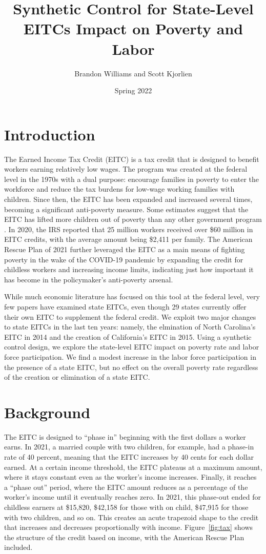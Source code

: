 \documentclass{article}
\author{Brandon Williams and Scott Kjorlien}
\title{Synthetic Control for State-Level EITCs Impact on Poverty and Labor}
\date{Spring 2022}
\begin{document}
\maketitle

\section{Introduction}

The Earned Income Tax Credit (EITC) is a tax credit that is designed to benefit workers earning relatively low wages. The program was created at the federal level in the 1970s with a dual purpose: encourage families in poverty to enter the workforce and reduce the tax burdens for low-wage working families with children. Since then, the EITC has been expanded and increased several times, becoming a significant anti-poverty measure. Some estimates suggest that the EITC has lifted more children out of poverty than any other government program  \citep{zahradnik2004state}. In 2020, the IRS reported that 25 million workers received over \$60 million in EITC credits, with the average amount being \$2,411 per family. The American Rescue Plan of 2021 further leveraged the EITC as a main means of fighting poverty in the wake of the COVID-19 pandemic by expanding the credit for childless workers and increasing income limits, indicating just how important it has become in the policymaker’s anti-poverty arsenal.

While much economic literature has focused on this tool at the federal level, very few papers have examined state EITCs, even though 29 states currently offer their own EITC to supplement the federal credit. We exploit two major changes to state EITCs in the last ten years: namely, the elmination of North Carolina's EITC in 2014 and the creation of California's EITC in 2015. Using a synthetic control design, we explore the state-level EITC impact on poverty rate and labor force participation. We find a modest increase in the labor force participation in the presence of a state EITC, but no effect on the overall poverty rate regardless of the creation or elimination of a state EITC. 

\section{Background}

The EITC is designed to “phase in” beginning with the first dollars a worker earns. In 2021, a married couple with two children, for example, had a phase-in rate of 40 percent, meaning that the EITC increases by 40 cents for each dollar earned. At a certain income threshold, the EITC plateaus at a maximum amount, where it stays constant even as the worker’s income increases. Finally, it reaches a “phase out” period, where the EITC amount reduces as a percentage of the worker’s income until it eventually reaches zero. In 2021, this phase-out ended for childless earners at \$15,820, \$42,158 for those with on child, \$47,915 for those with two children, and so on. This creates an acute trapezoid shape to the credit that increases and decreases proportionally with income. Figure~\ref{fig:tax} shows the structure of the credit based on income, with the American Rescue Plan included. 
\end{document}
